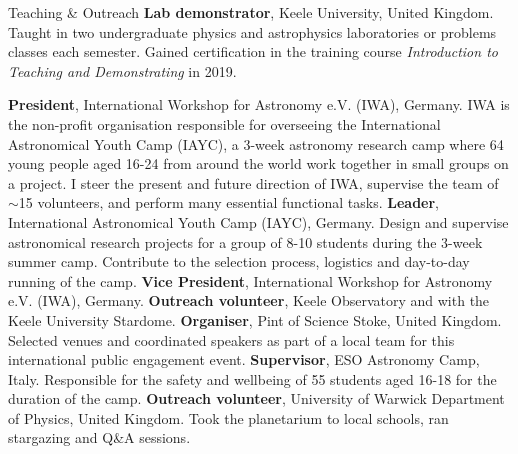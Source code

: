 \begin{rubric}{Teaching \& Outreach}
\entry*[2018 -- 2022]%
    \textbf{Lab demonstrator}, Keele University, United Kingdom. Taught in two undergraduate physics and astrophysics laboratories or problems classes each semester. Gained certification in the training course \emph{Introduction to Teaching and Demonstrating} in 2019.

\entry*[2023 -- ~~~~~\,\,\,~~~]%
    \textbf{President}, International Workshop for Astronomy e.V. (IWA), Germany. IWA is the non-profit organisation responsible for overseeing the International Astronomical Youth Camp (IAYC), a 3-week astronomy research camp where 64 young people aged 16-24 from around the world work together in small groups on a project. I steer the present and future direction of IWA, supervise the team of $\sim$15 volunteers, and perform many essential functional tasks.
\entry*[2017 -- ~~~~~\,\,\,~~~]%
    \textbf{Leader}, International Astronomical Youth Camp (IAYC), Germany. Design and supervise astronomical research projects for a group of 8-10 students during the 3-week summer camp. Contribute to the selection process, logistics and day-to-day running of the camp.
\entry*[2021 -- 2023]%
    \textbf{Vice President}, International Workshop for Astronomy e.V. (IWA), Germany.
\entry*[2019 -- 2022]%
    \textbf{Outreach volunteer}, Keele Observatory and with the Keele University Stardome. 
\entry*[2019 -- 2020]%
    \textbf{Organiser}, Pint of Science Stoke, United Kingdom. Selected venues and coordinated speakers as part of a local team for this international public engagement event.
\entry*[2017 -- 2019]%
    \textbf{Supervisor}, ESO Astronomy Camp, Italy. Responsible for the safety and wellbeing of 55 students aged 16-18 for the duration of the camp.%
\entry*[2017 -- 2018]%
    \textbf{Outreach volunteer}, University of Warwick Department of Physics, United Kingdom. Took the planetarium to local schools, ran stargazing and Q\&A sessions.

    
\end{rubric}